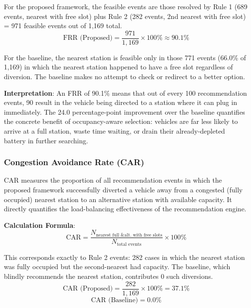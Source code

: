 \documentclass[conference]{IEEEtran}
\begin{document}
For the proposed framework, the feasible events are those resolved by
Rule 1 (689 events, nearest with free slot) plus Rule 2 (282 events,
2nd nearest with free slot) = 971 feasible events out of 1,169 total.
\begin{equation}
  \text{FRR (Proposed)} = \frac{971}{1{,}169} \times 100\% \approx 90.1\%
  \label{eq:frr_prop}
\end{equation}

For the baseline, the nearest station is feasible only in those 771
events (66.0\% of 1,169) in which the nearest station happened to have
a free slot regardless of diversion. The baseline makes no attempt to
check or redirect to a better option.

\textbf{Interpretation}: An FRR of 90.1\% means that out of every 100
recommendation events, 90 result in the vehicle being directed to a
station where it can plug in immediately. The 24.0 percentage-point
improvement over the baseline quantifies the concrete benefit of
occupancy-aware selection: vehicles are far less likely to arrive at a
full station, waste time waiting, or drain their already-depleted
battery in further searching.

\subsubsection{Congestion Avoidance Rate (CAR)} CAR measures the proportion of all recommendation
events in which the proposed framework successfully diverted a vehicle
away from a congested (fully occupied) nearest station to an alternative
station with available capacity. It directly quantifies the
load-balancing effectiveness of the recommendation engine.

\textbf{Calculation Formula}:
\begin{equation}
  \text{CAR} =
    \frac{N_{\text{nearest full \& alt.\ with free slots}}}
         {N_{\text{total events}}}
    \times 100\%
  \label{eq:car}
\end{equation}

This corresponds exactly to Rule 2 events: 282 cases in which the
nearest station was fully occupied but the second-nearest had capacity.
The baseline, which blindly recommends the nearest station, contributes
0 such diversions.
\begin{equation}
  \text{CAR (Proposed)} = \frac{282}{1{,}169} \times 100\% = 37.1\%
  \label{eq:car_prop}
\end{equation}
\begin{equation}
  \text{CAR (Baseline)} = 0.0\%
  \label{eq:car_base}
\end{equation}
\end{document}
